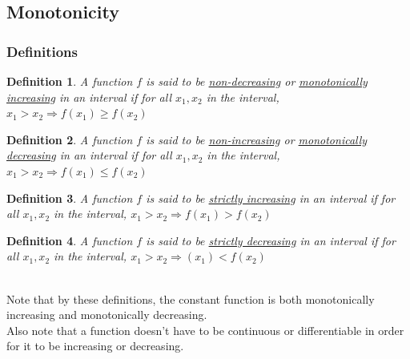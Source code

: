 \documentclass[14]{article}
\newtheorem{define}{Definition}
\theoremstyle{definition}
\begin{document}
\subsection{Monotonicity}
\subsubsection{Definitions}
\begin{define}
A function $f$ is said to be \underline{non-decreasing} or \underline{monotonically increasing} in an interval if for all $x_1, x_2$ in the interval, $x_1 > x_2 \Rightarrow f(x_1) \geq f(x_2)$
\end{define}
\begin{define}
A function $f$ is said to be \underline{non-increasing} or \underline{monotonically decreasing} in an interval if for all $x_1, x_2$ in the interval, $x_1 > x_2 \Rightarrow f(x_1) \leq f(x_2)$
\end{define}
\begin{define}
A function $f$ is said to be \underline{strictly increasing} in an interval if for all $x_1, x_2$ in the interval, $x_1 > x_2 \Rightarrow f(x_1) > f(x_2)$
\end{define}
\begin{define}
A function $f$ is said to be \underline{strictly decreasing} in an interval if for all $x_1, x_2$ in the interval, $x_1 > x_2 \Rightarrow (x_1) < f(x_2)$
\end{define}\;\\
Note that by these definitions, the constant function is both monotonically increasing and monotonically decreasing.\\
Also note that a function doesn't have to be continuous or differentiable in order for it to be increasing or decreasing.
\end{document}
